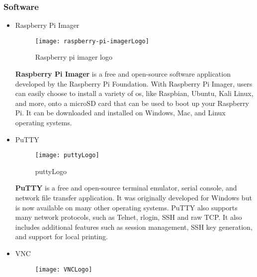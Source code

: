 \subsubsection{Software}
\begin{itemize}
   

  \item Raspberry Pi Imager
\begin{figure}[h]
       \centering
        \texttt{[image: raspberry-pi-imagerLogo]}
   
        \caption{Raspberry pi imager logo}
        \label{fig:raspberry-pi-imagerLogo}
    \end{figure}
\FloatBarrier
\subitem\textbf{Raspberry Pi Imager}  is a free and open-source software application developed by the Raspberry Pi Foundation.\cite{RSND}
With Raspberry Pi Imager, users can easily choose to install a variety of os, like Raspbian, Ubuntu, Kali Linux, and more,  onto a microSD card that can be used to boot up your Raspberry Pi.
\subitem  It can be downloaded and installed on Windows, Mac, and Linux operating systems.\cite{RSND}
 \item PuTTY
\FloatBarrier
\begin{figure}[h]
       \centering
        \texttt{[image: puttyLogo]}
   
        \caption{puttyLogo}
        \label{fig:}
    \end{figure}
\FloatBarrier
\subitem\textbf{PuTTY} is a free and open-source terminal emulator, serial console, and network file transfer application. It was originally developed for Windows but is now available on many other operating systems.\cite{PYND}
\subitem PuTTY also supports many network protocols, such as Telnet, rlogin, SSH and raw TCP. It also includes additional features such as session management, SSH key generation, and support for local printing.\cite{PYND}
 \item VNC
\FloatBarrier
\begin{figure}[h]
       \centering
        \texttt{[image: VNCLogo]}
   

\end{figure}
\end{itemize}
